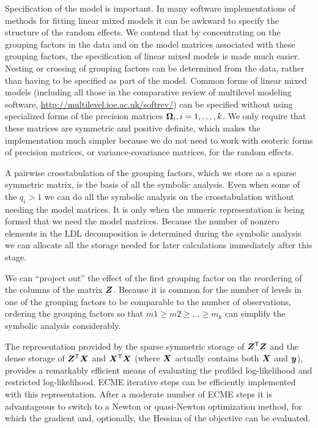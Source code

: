\documentclass[12pt]{article}
\begin{document}
Specification of the model is important.  In many software
implementations of methods for fitting linear mixed models it can be
awkward to specify the structure of the random effects.  We contend
that by concentrating on the grouping factors in the data and on the
model matrices associated with these grouping factors, the
specification of linear mixed models is made much easier.  Nesting or
crossing of grouping factors can be determined from the data, rather
than having to be specified as part of the model.  Common forms of
linear mixed models (including all those in the comparative review of
multilevel modeling software,
\url{http://multilevel.ioe.ac.uk/softrev/}) can be specified without
using specialized forms of the precision matrices $\bm{\Omega}_i,
i=1,\dots,k$.  We only require that these matrices are symmetric and
positive definite, which makes the implementation much simpler because
we do not need to work with esoteric forms of precision matrices, or
variance-covariance matrices, for the random effects.

A pairwise crosstabulation of the grouping factors, which we store as
a sparse symmetric matrix, is the basis of all the symbolic analysis.
Even when some of the $q_i>1$ we can do all the symbolic analysis on
the crosstabulation without needing the model matrices.  It is only
when the numeric representation is being formed that we need the model
matrices.  Because the number of nonzero elements in the LDL
decomposition is determined during the symbolic analysis we can
allocate all the storage needed for later calculations immediately
after this stage.

We can ``project out'' the effect of the first grouping factor on the
reordering of the columns of the matrix $\bm{Z}$.  Because it is common
for the number of levels in one of the grouping factors to be
comparable to the number of observations, ordering the grouping
factors so that $m1\ge m2\ge\dots\ge m_k$ can simplify the symbolic
analysis considerably.

The representation provided by the sparse symmetric storage of
$\bm{Z}^\mathsf{T}\bm{Z}$ and the dense storage of $\bm{Z}^\mathsf{T}\bm{X}$ and
$\bm{X}^\mathsf{T}\bm{X}$ (where $\bm{X}$ actually contains both $\bm{X}$ and $\bm{y}$),
provides a remarkably efficient means of evaluating the profiled
log-likelihood and restricted log-likelihood.  ECME
iterative steps can be efficiently implemented with this
representation.  After a moderate number of ECME steps it is advantageous
to switch to a Newton or quasi-Newton optimization method, for
which the gradient and, optionally, the Hessian of the objective can
be evaluated.
\end{document}
